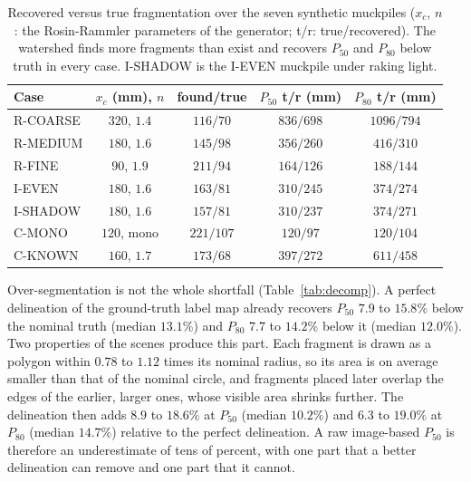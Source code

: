 \documentclass[journal]{IEEEtran}
\begin{document}
\begin{table}[!t]
\centering
\caption{Recovered versus true fragmentation over the seven synthetic muckpiles ($x_c$, $n$: the Rosin-Rammler
parameters of the generator; t/r: true/recovered). The watershed finds more fragments than exist and recovers
$P_{50}$ and $P_{80}$ below truth in every case. I-SHADOW is the I-EVEN muckpile under raking light.}
\label{tab:cases}
\footnotesize
\begin{tabular}{@{}l c c c c@{}}
\toprule
Case & $x_c$ (mm), $n$ & found/true & $P_{50}$ t/r (mm) & $P_{80}$ t/r (mm) \\
\midrule
R-COARSE & $320$, $1.4$ & $116/70$  & $836/698$ & $1096/794$ \\
R-MEDIUM & $180$, $1.6$ & $145/98$  & $356/260$ & $416/310$ \\
R-FINE   & $90$, $1.9$  & $211/94$  & $164/126$ & $188/144$ \\
I-EVEN   & $180$, $1.6$ & $163/81$  & $310/245$ & $374/274$ \\
I-SHADOW & $180$, $1.6$ & $157/81$  & $310/237$ & $374/271$ \\
C-MONO   & $120$, mono  & $221/107$ & $120/97$  & $120/104$ \\
C-KNOWN  & $160$, $1.7$ & $173/68$  & $397/272$ & $611/458$ \\
\bottomrule
\end{tabular}
\end{table}

Over-segmentation is not the whole shortfall (Table~\ref{tab:decomp}). A perfect delineation of the ground-truth
label map already recovers $P_{50}$ $7.9$ to $15.8\%$ below the nominal truth (median $13.1\%$) and $P_{80}$ $7.7$
to $14.2\%$ below it (median $12.0\%$). Two properties of the scenes produce this part. Each fragment is drawn as a
polygon within $0.78$ to $1.12$ times its nominal radius, so its area is on average smaller than that of the nominal
circle, and fragments placed later overlap the edges of the earlier, larger ones, whose visible area shrinks
further. The delineation then adds $8.9$ to $18.6\%$ at $P_{50}$ (median $10.2\%$) and $6.3$ to $19.0\%$ at $P_{80}$
(median $14.7\%$) relative to the perfect delineation. A raw image-based $P_{50}$ is therefore an underestimate of
tens of percent, with one part that a better delineation can remove and one part that it cannot.
\end{document}
